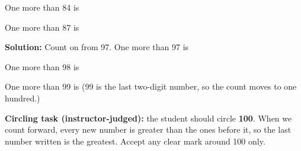 \documentclass[12pt]{article}
\begin{document}
One more than 84 is 

One more than 87 is 


\textbf{Solution:} Count on from 97. One more than 97 is 

One more than 98 is 

One more than 99 is  \quad (99 is the last two-digit number, so the
count moves to one hundred.)

\textbf{Circling task (instructor-judged):} the student should circle
\textbf{100}. When we count forward, every new number is greater than the ones
before it, so the last number written is the greatest. Accept any clear mark
around 100 only.
\end{document}
